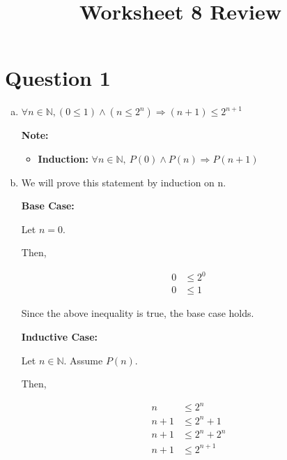 \documentclass[12pt]{article}
\begin{document}
\title{Worksheet 8 Review}
\maketitle

\section*{Question 1}
\begin{enumerate}[a.]
    \item

    $\forall n \in \mathbb{N,} (0 \leq 1) \land (n \leq 2^n) \Rightarrow (n+1) \leq 2^{n+1}$

    \bigskip

    \textbf{Note:}
    \begin{itemize}
        \item \textbf{Induction:} $\forall n \in \mathbb{N},\:P(0) \land P(n) \Rightarrow P(n+1)$
    \end{itemize}

    \item

    We will prove this statement by induction on n.

    \textbf{Base Case:}

    \bigskip

    Let $n = 0$.

    \bigskip

    Then,

    \begin{align}
        0 &\leq 2^0\\
        0 &\leq 1
    \end{align}

    \bigskip

    Since the above inequality is true, the base case holds.

    \bigskip

    \textbf{Inductive Case:}

    \bigskip

    Let $n \in \mathbb{N}$. Assume $P(n)$.

    \bigskip

    Then,

    \begin{align}
        n &\leq 2^n\\
        n+1 &\leq 2^n + 1\\
        n+1 &\leq 2^n + 2^n\\
        n+1 &\leq 2^{n+1}
    \end{align}


\end{enumerate}
\end{document}
